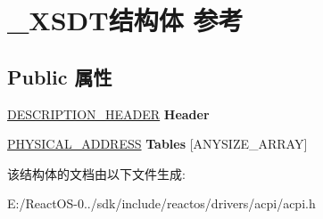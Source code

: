 \hypertarget{struct___x_s_d_t}{}\section{\+\_\+\+X\+S\+D\+T结构体 参考}
\label{struct___x_s_d_t}
\subsection*{Public 属性}
\begin{DoxyCompactItemize}
\item 
\mbox{\label{struct___x_s_d_t_ae1fe4680405ceea1b6ff4b9555d0bf65}} 
\hyperlink{struct___d_e_s_c_r_i_p_t_i_o_n___h_e_a_d_e_r}{D\+E\+S\+C\+R\+I\+P\+T\+I\+O\+N\+\_\+\+H\+E\+A\+D\+ER} {\bfseries Header}
\item 
\mbox{\label{struct___x_s_d_t_aa7355fbcef44ae187c34a68e35c6f282}} 
\hyperlink{union___l_a_r_g_e___i_n_t_e_g_e_r}{P\+H\+Y\+S\+I\+C\+A\+L\+\_\+\+A\+D\+D\+R\+E\+SS} {\bfseries Tables} \mbox{[}A\+N\+Y\+S\+I\+Z\+E\+\_\+\+A\+R\+R\+AY\mbox{]}
\end{DoxyCompactItemize}


该结构体的文档由以下文件生成\+:\begin{DoxyCompactItemize}
\item 
E\+:/\+React\+O\+S-\/0../sdk/include/reactos/drivers/acpi/acpi.\+h\end{DoxyCompactItemize}
